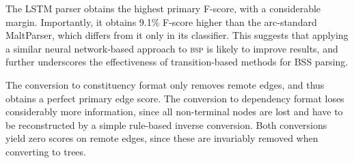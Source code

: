 \documentclass[11pt]{article}
\begin{document}
The LSTM parser obtains the highest primary F-score,
with a considerable margin. Importantly, it obtains 9.1\%
F-score higher than the arc-standard MaltParser, which
differs from it only in its classifier.
This suggests that applying a similar neural network-based approach to
\textsc{bsp} is likely to improve results,
and further underscores the effectiveness of transition-based 
methods for BSS parsing. 

The conversion to constituency format only removes remote edges,
and thus obtains a perfect primary edge score.
The conversion to dependency format loses considerably more information, since
all non-terminal nodes are lost and have to be reconstructed by a
simple rule-based inverse conversion. Both conversions yield zero scores on remote edges,
since these are invariably removed when converting to trees.
\end{document}

